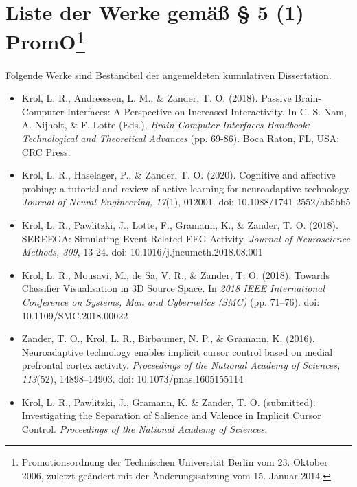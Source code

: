 \documentclass[a4paper,11pt]{article}
\begin{document}
\thispagestyle{empty}

\section*{Liste der Werke gemäß § 5 (1) PromO\footnote{Promotionsordnung der Technischen Universität Berlin vom 23. Oktober 2006, zuletzt geändert mit der Änderungssatzung vom 15. Januar 2014.}}

Folgende Werke sind Bestandteil der angemeldeten kumulativen Dissertation.

\begin{itemize}
    \item Krol, L. R., Andreessen, L. M., \& Zander, T. O. (2018). Passive Brain-Computer Interfaces: A Perspective on Increased Interactivity. In C. S. Nam, A. Nijholt, \& F. Lotte (Eds.), \textit{Brain-Computer Interfaces Handbook: Technological and Theoretical Advances} (pp. 69-86). Boca Raton, FL, USA: CRC Press.
    \item Krol, L. R., Haselager, P., \& Zander, T. O. (2020). Cognitive and affective probing: a tutorial and review of active learning for neuroadaptive technology. \textit{Journal of Neural Engineering, 17}(1), 012001. doi: 10.1088/1741-2552/ab5bb5
    \item Krol, L. R., Pawlitzki, J., Lotte, F., Gramann, K., \& Zander, T. O. (2018). SEREEGA: Simulating Event-Related EEG Activity. \textit{Journal of Neuroscience Methods, 309}, 13-24. doi: 10.1016/j.jneumeth.2018.08.001
    \item Krol, L. R., Mousavi, M., de Sa, V. R., \& Zander, T. O. (2018). Towards Classifier Visualisation in 3D Source Space. In \textit{2018 IEEE International Conference on Systems, Man and Cybernetics (SMC)} (pp. 71–76). doi: 10.1109/SMC.2018.00022
    \item Zander, T. O., Krol, L. R., Birbaumer, N. P., \& Gramann, K. (2016). Neuroadaptive technology enables implicit cursor control based on medial prefrontal cortex activity. \textit{Proceedings of the National Academy of Sciences, 113}(52), 14898–14903. doi: 10.1073/pnas.1605155114
    \item Krol, L. R., Pawlitzki, J., Gramann, K. \& Zander, T. O. (submitted). Investigating the Separation of Salience and Valence in Implicit Cursor Control. \textit{Proceedings of the National Academy of Sciences}.
\end{itemize}
\end{document}
